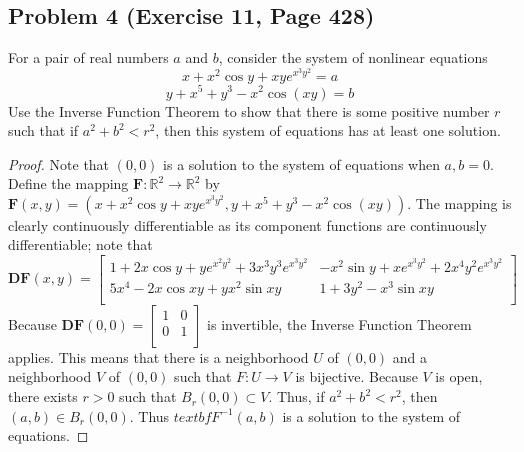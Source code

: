 \documentclass{article}
\begin{document}
\subsection*{Problem 4 (Exercise 11, Page 428)}
For a pair of real numbers $a$ and $b$, consider the system of nonlinear equations 
\[ x + x^2\cos{y} + xye^{x^3y^2} = a\]
\[ y + x^5 + y^3 - x^2\cos(xy) = b\]
Use the Inverse Function Theorem to show that there is some positive number $r$ such that if $a^2 + b^2 < r^2$, then this system of equations has at least one solution.
\begin{proof}
Note that $(0, 0)$ is a solution to the system of equations when $a, b = 0$. Define the mapping $\textbf{F} \colon \mathbb{R}^2 \to \mathbb{R}^2$ by $\textbf{F}(x, y) = (x + x^2\cos{y} + xye^{x^3y^2}, y + x^5 + y^3 - x^2\cos(xy))$. The mapping is clearly continuously differentiable as its component functions are continuously differentiable; note that
\[ \textbf{DF}(x, y) = \begin{bmatrix}
1 + 2x\cos{y} + ye^{x^2y^2} + 3x^3y^3e^{x^3y^2} & -x^2\sin{y} + xe^{x^3y^2} + 2x^4y^2e^{x^3y^2} \\
5x^4 - 2x\cos{xy} + yx^2\sin{xy} & 1 + 3y^2 - x^3\sin{xy} \\
\end{bmatrix} \]
Because $\textbf{DF}(0, 0) = \begin{bmatrix}
1 & 0 \\
0 & 1 \\
\end{bmatrix}$ is invertible, the Inverse Function Theorem applies. This means that there is a neighborhood $U$ of $(0, 0)$ and a neighborhood $V$ of $(0, 0)$ such that $F \colon U \to V$ is bijective. Because $V$ is open, there exists $r > 0$ such that $B_r(0, 0) \subset V$. Thus, if $a^2 + b^2 < r^2$, then $(a, b) \in B_r(0, 0)$. Thus $textbf{F}^{-1}(a, b)$ is a solution to the system of equations. 
\end{proof}
\end{document}
